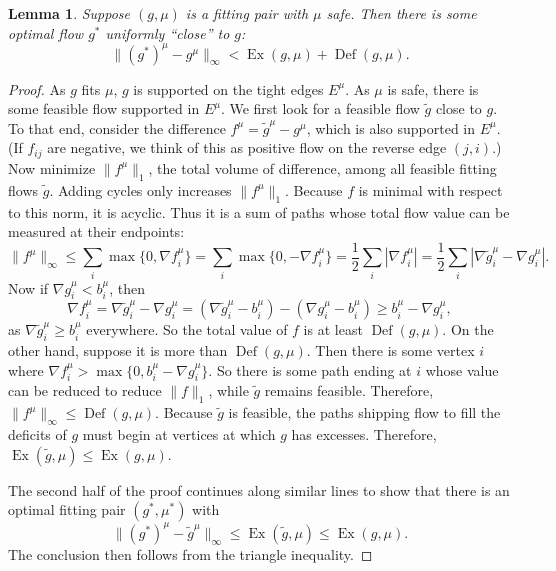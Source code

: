 \documentclass[11pt]{article}
\newtheorem{lemma}[theorem]{Lemma}
\theoremstyle{definition}
\theoremstyle{definition}
\newcommand{\fu}{f^{\mu}}
\newcommand{\nfiu}{\nabla \fu_i}
\newcommand{\biu}{b_{i}^{\mu}}
\DeclareMathOperator{\Ex}{Ex}
\DeclareMathOperator{\Def}{Def}
\begin{document}
    \begin{lemma} \label{lem.bound-dist}
    Suppose $(g, \mu)$ is a fitting pair with $\mu$ safe. Then there is some optimal flow $g^*$
    uniformly ``close'' to $g$:
    \[ \|(g^*)^\mu - g^\mu\|_\infty < \Ex(g, \mu) + \Def(g, \mu). \]
    \end{lemma}
    \begin{proof}
    As $g$ fits $\mu$, $g$ is supported on the tight edges $E^\mu$. As
    $\mu$ is safe, there is some feasible flow supported in $E^\mu$. We first
    look for a feasible flow $\tilde{g}$ close to $g$. To that end, consider the
    difference $f^\mu = \tilde{g}^\mu - g^\mu$, which is also supported in $E^\mu$.
    (If $f_{ij}$ are negative, we think of this as positive flow on the reverse edge $(j, i)$.)
    Now minimize $\|f^\mu\|_1$, the total volume of difference,
    among all feasible fitting flows $\tilde{g}$. Adding cycles only increases $\|f^\mu\|_1$.
    Because $f$ is minimal with respect to this norm, it is acyclic. Thus it is a sum of
    paths whose total flow value can be measured at their endpoints:
    \[ \|f^\mu\|_\infty \leq \sum_i \max\{0, \nfiu\} = \sum_i \max\{0, -\nfiu\} = \frac{1}{2}\sum_i |\nfiu|
     = \frac{1}{2}\sum_i |\nabla \tilde{g}^\mu_i - \nabla g^\mu_i|. \]
    Now if $\nabla g_i^\mu < b_i^\mu$, then
    \[ \nfiu = \nabla \tilde{g}_i^\mu - \nabla g_i^\mu
     = (\nabla \tilde{g}_i^\mu - b_i^\mu) - (\nabla g_i^\mu - b_i^\mu) \geq b_i^\mu - \nabla g_i^\mu, \]
    as $\nabla \tilde{g}_i^\mu \geq b_i^\mu$ everywhere. So the total value of $f$ is at least
    $\Def(g, \mu)$. On the other hand, suppose it is more than $\Def(g, \mu)$. Then there
    is some vertex $i$ where $\nfiu > \max\{0, \biu - \nabla g_i^\mu\}$. So there is some path
    ending at $i$ whose value can be reduced to reduce $\|f\|_1$, while $\tilde{g}$
    remains feasible. Therefore, $\|f^\mu\|_\infty \leq \Def(g, \mu)$. Because $\tilde{g}$ is feasible,
    the paths shipping flow to fill the deficits of $g$ must begin at vertices at which $g$ has
    excesses. Therefore, $\Ex(\tilde{g}, \mu) \leq \Ex(g, \mu)$.
    
    The second half of the proof continues along similar lines to show that there is an optimal
    fitting pair $(g^*, \mu^*)$ with
    \[ \|(g^*)^\mu - \tilde{g}^\mu\|_\infty \leq \Ex(\tilde{g}, \mu) \leq \Ex(g, \mu). \]
    The conclusion then follows from the triangle inequality.
    
    \end{proof}
    
\end{document}
